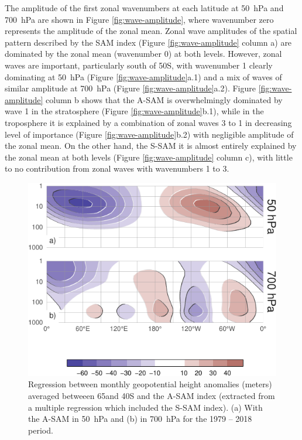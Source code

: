\documentclass[smallextended]{svjour3}       %
\begin{document}
The amplitude of the first zonal wavenumbers at each latitude at 50~hPa and 700~hPa are shown in Figure \ref{fig:wave-amplitude}, where wavenumber zero represents the amplitude of the zonal mean.
Zonal wave amplitudes of the spatial pattern described by the SAM index (Figure \ref{fig:wave-amplitude} column a) are dominated by the zonal mean (wavenumber 0) at both levels.
However, zonal waves are important, particularly south of 50\degree S, with wavenumber 1 clearly dominating at 50~hPa (Figure \ref{fig:wave-amplitude}a.1) and a mix of waves of similar amplitude at 700~hPa (Figure \ref{fig:wave-amplitude}a.2).
Figure \ref{fig:wave-amplitude} column b shows that the A\nobreakdash-SAM is overwhelmingly dominated by wave 1 in the stratosphere (Figure \ref{fig:wave-amplitude}b.1), while in the troposphere it is explained by a combination of zonal waves 3 to 1 in decreasing level of importance (Figure \ref{fig:wave-amplitude}b.2) with negligible amplitude of the zonal mean.
On the other hand, the S\nobreakdash-SAM it is almost entirely explained by the zonal mean at both levels (Figure \ref{fig:wave-amplitude} column c), with little to no contribution from zonal waves with wavenumbers 1 to 3.

\begin{figure}
\includegraphics{vertical-regression-1} \caption{Regression between monthly geopotential height anomalies (meters) averaged betweeen 65\degree and 40\degree S and the A\nobreakdash-SAM index (extracted from a multiple regression which included the S\nobreakdash-SAM index). (a) With the A\nobreakdash-SAM in 50~hPa and (b) in 700~hPa for the 1979 -- 2018 period.}\label{fig:vertical-regression}
\end{figure}
\end{document}
